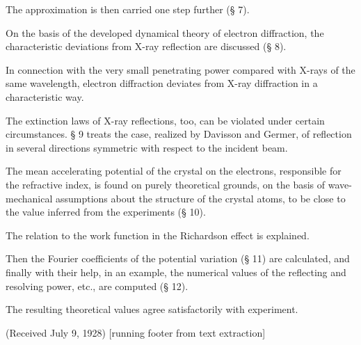 \documentclass[10pt]{article}
\begin{document}
The approximation is then carried one step further (§ 7).\par
On the basis of the developed dynamical theory of electron diffraction, the characteristic deviations from X-ray reflection are discussed (§ 8).\par
In connection with the very small penetrating power compared with X-rays of the same wavelength, electron diffraction deviates from X-ray diffraction in a characteristic way.\par
The extinction laws of X-ray reflections, too, can be violated under certain circumstances. § 9 treats the case, realized by Davisson and Germer, of reflection in several directions symmetric with respect to the incident beam.\par
The mean accelerating potential of the crystal on the electrons, responsible for the refractive index, is found on purely theoretical grounds, on the basis of wave-mechanical assumptions about the structure of the crystal atoms, to be close to the value inferred from the experiments (§ 10).\par
The relation to the work function in the Richardson effect is explained.\par
Then the Fourier coefficients of the potential variation (§ 11) are calculated, and finally with their help, in an example, the numerical values of the reflecting and resolving power, etc., are computed (§ 12).\par
The resulting theoretical values agree satisfactorily with experiment.\par
(Received July 9, 1928) [running footer from text extraction]\par
\end{document}
